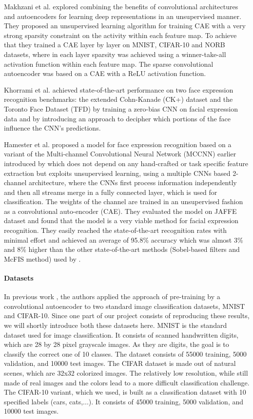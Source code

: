 \documentclass{article}
\begin{document}
Makhzani et al. \citep{Makhzani14} explored combining the benefits of convolutional architectures and autoencoders for learning deep representations in an unsupervised manner. They proposed an unsupervised learning algorithm for training CAE with a very strong sparsity constraint on the activity within each feature map. To achieve that they trained a CAE layer by layer on MNIST, CIFAR-10 and NORB datasets, where in each layer sparsity was achieved using a winner-take-all activation function within each feature map.  The sparse convolutional autoencoder was based on a CAE with a ReLU activation function.

Khorrami et al. \citep{Khorrami17} achieved state-of-the-art performance on two face expression recognition
benchmarks: the extended Cohn-Kanade (CK+) dataset
and the Toronto Face Dataset (TFD) by training a zero-bias CNN on facial expression data and by introducing an approach to decipher which portions of the face influence the CNN’s predictions.

Hamester et al. \citep{hamester15} proposed a model for face expression recognition based on a variant of the Multi-channel Convolutional Neural Network (MCCNN) earlier introduced by \cite{Barros14} which does not depend on any hand-crafted or task specific feature extraction but exploits unsupervised learning, using a multiple CNNs based 2-channel architecture, where the CNNs first process information independently and then all streams merge in a fully connected layer, which is used for classification. The weights of the channel are trained in an unsupervised fashion as a convolutional auto-encoder (CAE). They evaluated the model on JAFFE dataset and found that the model is a very viable method for facial expression recognition. They easily reached the state-of-the-art recognition rates with minimal effort and achieved an average of 95.8\% accuracy which was almost 3\% and 8\% higher than the other state-of-the-art methods (Sobel-based filters and McFIS method) used by \citep{Subramanian12}.

\paragraph{Datasets}
In previous work \citep{masci2011stacked}, the authors applied the approach of pre-training by a convolutional autoencoder to two standard image classification datasets, MNIST and CIFAR-10.
Since one part of our project consists of reproducing these results, we will shortly introduce both these datasets here.
MNIST \citep{lecun1998mnist} is the standard dataset used for image classification. It consists of scanned handwritten digits, which are 28 by 28 pixel grayscale images. As they are digits, the goal is to classify the correct one of 10 classes.
The dataset consists of 55000 training, 5000 validation, and 10000 test images.
The CIFAR dataset \citep{krizhevsky2009learning} is made out of natural scenes, which are 32x32 colorized images. The relatively low resolution, while still made of real images and the colors lead to a more difficult classification challenge.
The CIFAR-10 variant, which we used, is built as a classification dataset with 10 specified labels (cars, cats,...).
It consists of 45000 training, 5000 validation, and 10000 test images.
\end{document}
